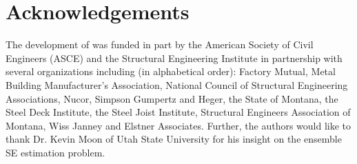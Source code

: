 \section{Acknowledgements} 

The development of  was funded in part by the American Society of Civil Engineers (ASCE) and the Structural Engineering Institute in partnership with several organizations including (in alphabetical order): Factory Mutual, Metal Building Manufacturer’s Association, National Council of Structural Engineering Associations, Nucor, Simpson Gumpertz and Heger, the State of Montana, the Steel Deck Institute, the Steel Joist Institute, Structural Engineers Association of Montana, Wiss Janney and Elstner Associates. Further, the authors would like to thank Dr. Kevin Moon of Utah State University for his insight on the ensemble SE estimation problem. 




\address{Jadon Wagstaff\\
  Huntsman Cancer Institute, University of Utah\\
  Department of Oncological Sciences\\
  2000 Circle of Hope\\
  Salt Lake City, UT 84112, USA\\
  }

\address{Brennan Bean\\
  Utah State University\\
  Department of Mathematics and Statistics\\
  3900 Old Main Hill\\
  Logan, UT 84322, USA\\
  }

